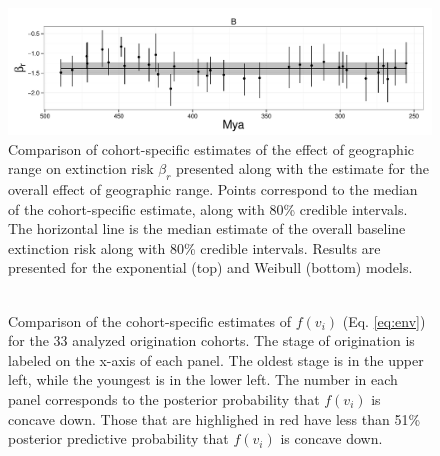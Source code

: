 \documentclass[12pt,letterpaper]{article}
\begin{document}
\begin{figure}[ht]
  \centering
  \includegraphics[height = 0.5\textheight,width=\textwidth,keepaspectratio=true]{figure/range_cohort}
  \caption{Comparison of cohort-specific estimates of the effect of geographic range on extinction risk \(\beta_{r}\) presented along with the estimate for the overall effect of geographic range. Points correspond to the median of the cohort-specific estimate, along with 80\% credible intervals. The horizontal line is the median estimate of the overall baseline extinction risk along with 80\% credible intervals. Results are presented for the exponential (top) and Weibull (bottom) models.}
  \label{fig:cohort_range}
\end{figure}


\begin{figure}
  \centering
  \includegraphics[height = 0.5\textheight,width=\textwidth,keepaspectratio=true]{figure/cohort_quads}
  \caption{Comparison of the cohort-specific estimates of \(f(v_{i})\) (Eq. \ref{eq:env}) for the 33 analyzed origination cohorts. The stage of origination is labeled on the x-axis of each panel. The oldest stage is in the upper left, while the youngest is in the lower left. The number in each panel corresponds to the posterior probability that \(f(v_{i})\) is concave down. Those that are highlighed in red have less than 51\% posterior predictive probability that \(f(v_{i})\) is concave down.}
  \label{fig:env_cohort}
\end{figure}
\end{document}
